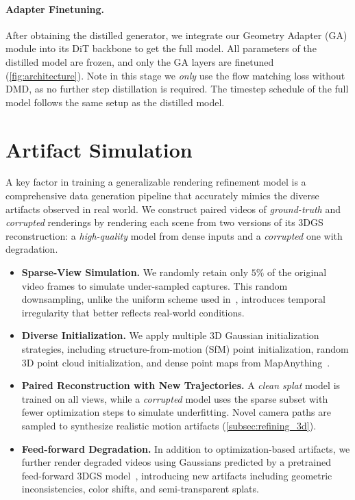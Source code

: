 \paragraph{Adapter Finetuning.}
After obtaining the distilled generator, we integrate our Geometry Adapter (GA) module into its DiT backbone to get the full model.
All parameters of the distilled model are frozen, and only the GA layers are finetuned (\cf\cref{fig:architecture}).
Note in this stage we \textit{only} use the flow matching loss without DMD, as no further step distillation is required. The timestep schedule of the full model follows the same setup as the distilled model. 

\section{Artifact Simulation}
\label{sec:data}
A key factor in training a generalizable rendering refinement model is a comprehensive data generation pipeline that accurately mimics the diverse artifacts observed in real world. 
We construct paired videos of \emph{ground-truth} and \emph{corrupted} renderings by rendering each scene from two versions of its 3DGS reconstruction: a \textit{high-quality} model from dense inputs and a \textit{corrupted} one with degradation.
\begin{itemize}
    \item \textbf{Sparse-View Simulation.} We randomly retain only $5\%$ of the original video frames to simulate under-sampled captures. 
    This random downsampling, unlike the uniform scheme used in~\cite{wu2025difix3d,Kim_2025_ExploreGS,liu2024dgsenhancer}, introduces temporal irregularity that better reflects real-world conditions.
    \item \textbf{Diverse Initialization.} We apply multiple 3D Gaussian initialization strategies, including structure-from-motion (SfM) point initialization, random 3D point cloud initialization, and dense point maps from MapAnything~\cite{keetha2025mapanything}.
    \item \textbf{Paired Reconstruction with New Trajectories.} A \textit{clean splat} model is trained on all views, while a \textit{corrupted} model uses the sparse subset with fewer optimization steps to simulate underfitting.
Novel camera paths are sampled to synthesize realistic motion artifacts (\cref{subsec:refining_3d}).
    \item \textbf{Feed-forward Degradation.} In addition to optimization-based artifacts, we further render degraded videos using Gaussians predicted by a pretrained feed-forward 3DGS model~\cite{xu2024depthsplat}, introducing new artifacts including geometric inconsistencies, color shifts, and semi-transparent splats. 
\end{itemize}

